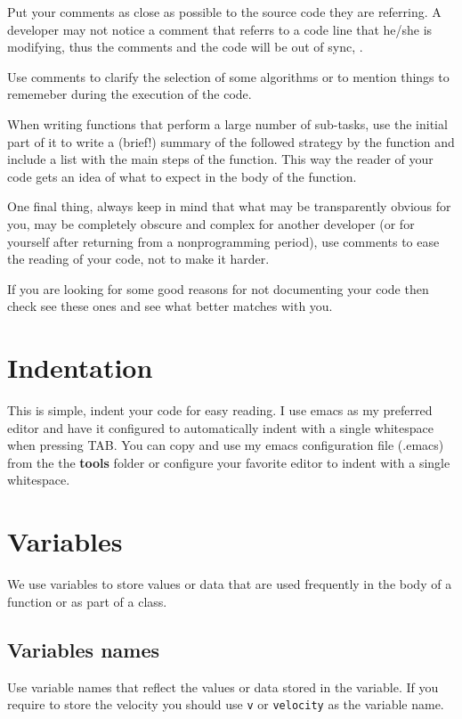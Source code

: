 \documentclass[12pt,a4paper,final]{report} %
\begin{document}
Put your comments as close as possible to the source code they are
referring. A developer may not notice a comment that referrs to a code
line that he/she is modifying, thus the comments and the code will be
out of sync, \cite{when_comments_go_bad:URL}.

Use comments to clarify the selection of some algorithms or to mention
things to rememeber during the execution of the code.

When writing functions that perform a large number of sub-tasks, use
the initial part of it to write a (brief!) summary of the followed
strategy by the function and include a list with the main steps of the
function. This way the reader of your code gets an idea of what to
expect in the body of the function.

One final thing, always keep in mind that what may be transparently
obvious for you, may be completely obscure and complex for another
developer (or for yourself after returning from a nonprogramming
period), use comments to ease the reading of your code, not to make it
harder.

If you are looking for some good reasons for not documenting your code
then check see these ones
\cite{why_programmers_do_not_comment_their_code:URL} and see what
better matches with you.

\section{Indentation}
This is simple, indent your code for easy reading. I use emacs as my
preferred editor and have it configured to automatically indent with a
single whitespace when pressing TAB. You can copy and use my emacs
configuration file (.emacs) from the the \textbf{tools} folder or
configure your favorite editor to indent with a single whitespace.

\section{Variables}
We use variables to store values or data that are used frequently in
the body of a function or as part of a class.

\subsection{Variables names}
Use variable names that reflect the values or data stored in the
variable. If you require to store the velocity you should use
\texttt{v} or \texttt{velocity} as the variable name. 
\end{document}
